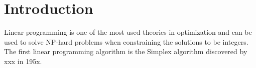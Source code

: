 \section{Introduction}
Linear programming is one of the most used theories in optimization and can be used to solve NP-hard problems when constraining the solutions to be integers. The first linear programming algorithm is the Simplex algorithm discovered by xxx in 195x. 